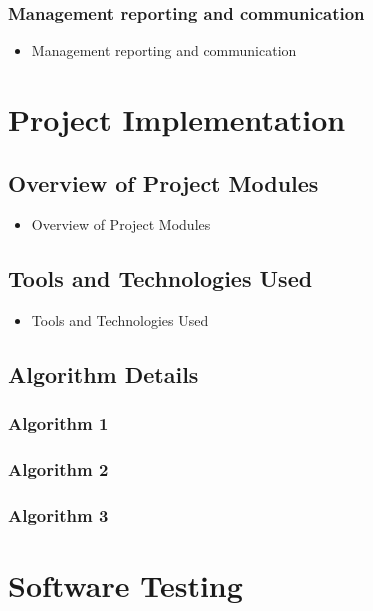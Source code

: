 \documentclass[oneside,a4paper,12pt]{book}
\begin{document}
\subsection{Management reporting and communication}
\begin{itemize}
    \item Management reporting and communication
\end{itemize}


\chapter{Project Implementation}
 
\section{Overview of Project Modules}
\begin{itemize}
    \item Overview of Project Modules
\end{itemize}



\section{Tools and Technologies Used}
\begin{itemize}
    \item Tools and Technologies Used
\end{itemize}


\section{Algorithm Details}
\subsection{Algorithm 1}
\subsection{Algorithm 2}
\subsection{Algorithm 3}


\newpage
\chapter{Software Testing}
\end{document}
